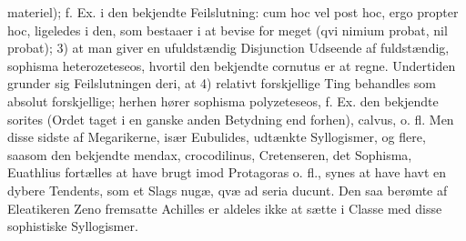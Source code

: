 \documentclass[12pt]{book}
\def\textit#1{#1}%
\begin{document}
materiel); f. Ex. i den bekjendte Feilslutning: \textit{cum hoc vel post hoc,
ergo propter hoc}, ligeledes i den, som bestaaer i at bevise for meget
(\textit{qvi nimium probat, nil probat}); 3) at man giver en ufuldstændig
Disjunction Udseende af fuldstændig, \textit{sophisma heterozeteseos}, hvortil
den bekjendte \textit{cornutus} er at regne. Undertiden grunder sig
Feilslutningen deri, at 4) relativt forskjellige Ting behandles som absolut
forskjellige; herhen hører \textit{sophisma polyzeteseos}, f. Ex. den bekjendte
\textit{sorites} (Ordet taget i en ganske anden Betydning end forhen),
\textit{calvus}, o. fl. Men disse sidste af Megarikerne, især Eubulides,
udtænkte Syllogismer, og flere, saasom den bekjendte \textit{mendax},
\textit{crocodilinus}, Cretenseren, det Sophisma, Euathlius fortælles at have
brugt imod Protagoras o. fl., synes at have havt en dybere Tendents, som et
Slags \textit{nugæ, qvæ ad seria ducunt}. Den saa berømte af Eleatikeren Zeno
fremsatte Achilles er aldeles ikke at sætte i Classe med disse sophistiske
Syllogismer.
\end{document}
